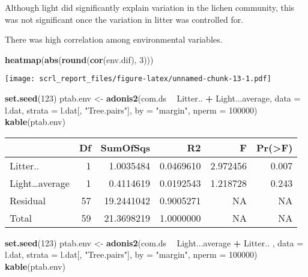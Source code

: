 \documentclass[]{article}
\newenvironment{Shaded}{\begin{snugshade}}{\end{snugshade}}
\newcommand{\KeywordTok}[1]{\textcolor[rgb]{0.13,0.29,0.53}{\textbf{#1}}}
\newcommand{\DataTypeTok}[1]{\textcolor[rgb]{0.13,0.29,0.53}{#1}}
\newcommand{\DecValTok}[1]{\textcolor[rgb]{0.00,0.00,0.81}{#1}}
\newcommand{\StringTok}[1]{\textcolor[rgb]{0.31,0.60,0.02}{#1}}
\newcommand{\OperatorTok}[1]{\textcolor[rgb]{0.81,0.36,0.00}{\textbf{#1}}}
\newcommand{\NormalTok}[1]{#1}
\begin{document}
Although light did significantly explain variation in the lichen
community, this was not significant once the variation in litter was
controlled for.

There was high correlation among environmental variables.

\begin{Shaded}
\begin{Highlighting}[]
\KeywordTok{heatmap}\NormalTok{(}\KeywordTok{abs}\NormalTok{(}\KeywordTok{round}\NormalTok{(}\KeywordTok{cor}\NormalTok{(env.dif), }\DecValTok{3}\NormalTok{)))}
\end{Highlighting}
\end{Shaded}

\texttt{[image: scrl\_report\_files/figure-latex/unnamed-chunk-13-1.pdf]}

\begin{Shaded}
\begin{Highlighting}[]
\KeywordTok{set.seed}\NormalTok{(}\DecValTok{123}\NormalTok{)}
\NormalTok{ptab.env <-}\StringTok{ }\KeywordTok{adonis2}\NormalTok{(com.ds }\OperatorTok{~}\StringTok{ }\NormalTok{Litter.. }\OperatorTok{+}\StringTok{  }\NormalTok{Light...average, }\DataTypeTok{data =}\NormalTok{ l.dat, }
                   \DataTypeTok{strata =}\NormalTok{ l.dat[, }\StringTok{"Tree.pairs"}\NormalTok{], }
                   \DataTypeTok{by =} \StringTok{"margin"}\NormalTok{, }\DataTypeTok{nperm =} \DecValTok{100000}\NormalTok{)}
\KeywordTok{kable}\NormalTok{(ptab.env)}
\end{Highlighting}
\end{Shaded}

\begin{longtable}[]{@{}lrrrrr@{}}
\toprule
& Df & SumOfSqs & R2 & F & Pr(\textgreater{}F)\tabularnewline
\midrule
\endhead
Litter.. & 1 & 1.0035484 & 0.0469610 & 2.972456 & 0.007\tabularnewline
Light\ldots{}average & 1 & 0.4114619 & 0.0192543 & 1.218728 &
0.243\tabularnewline
Residual & 57 & 19.2441042 & 0.9005271 & NA & NA\tabularnewline
Total & 59 & 21.3698219 & 1.0000000 & NA & NA\tabularnewline
\bottomrule
\end{longtable}

\begin{Shaded}
\begin{Highlighting}[]
\KeywordTok{set.seed}\NormalTok{(}\DecValTok{123}\NormalTok{)}
\NormalTok{ptab.env <-}\StringTok{ }\KeywordTok{adonis2}\NormalTok{(com.ds }\OperatorTok{~}\StringTok{ }\NormalTok{Light...average }\OperatorTok{+}\StringTok{ }\NormalTok{Litter.. , }\DataTypeTok{data =}\NormalTok{ l.dat, }
                   \DataTypeTok{strata =}\NormalTok{ l.dat[, }\StringTok{"Tree.pairs"}\NormalTok{], }
                   \DataTypeTok{by =} \StringTok{"margin"}\NormalTok{, }\DataTypeTok{nperm =} \DecValTok{100000}\NormalTok{)}
\KeywordTok{kable}\NormalTok{(ptab.env)}
\end{Highlighting}
\end{Shaded}
\end{document}
